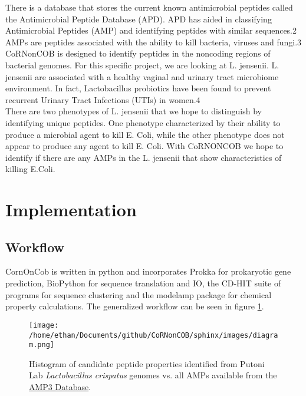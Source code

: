 \documentclass{article}
\begin{document}
There is a database that stores the current known antimicrobial peptides called the Antimicrobial Peptide Database (APD). APD has aided in classifying Antimicrobial Peptides (AMP) and identifying peptides with similar sequences.2 AMPs are peptides associated with the ability to kill bacteria, viruses and fungi.3 CoRNonCOB is designed to identify peptides in the noncoding regions of bacterial genomes. For this specific project, we are looking at L. jensenii. L. jensenii are associated with a healthy vaginal and urinary tract microbiome environment. In fact, Lactobacillus probiotics have been found to prevent recurrent Urinary Tract Infections (UTIs) in women.4
\\

There are two phenotypes of L. jensenii that we hope to distinguish by identifying unique peptides. One phenotype characterized by their ability to produce a microbial agent to kill E. Coli, while the other phenotype does not appear to produce any agent to kill E. Coli. With CoRNONCOB we hope to identify if there are any AMPs in the L. jensenii that show characteristics of killing E.Coli. 


\section{Implementation}

\subsection{Workflow}
CornOnCob is written in python and incorporates Prokka for prokaryotic gene prediction, BioPython for sequence translation and IO, the CD-HIT suite of programs for sequence clustering and the modelamp package for chemical property
calculations. The generalized workflow can be seen in figure \ref{flow}.
\\

\begin{figure}[h]
\label{flow}
\centering
\texttt{[image: /home/ethan/Documents/github/CoRNonCOB/sphinx/images/diagram.png]}
\caption{Histogram of candidate peptide properties identified from Putoni Lab \emph{Lactobacillus crispatus} genomes vs. all AMPs available from the \href{http://aps.unmc.edu/AP/main.php}{AMP3 Database}.}
\end{figure}
\end{document}
